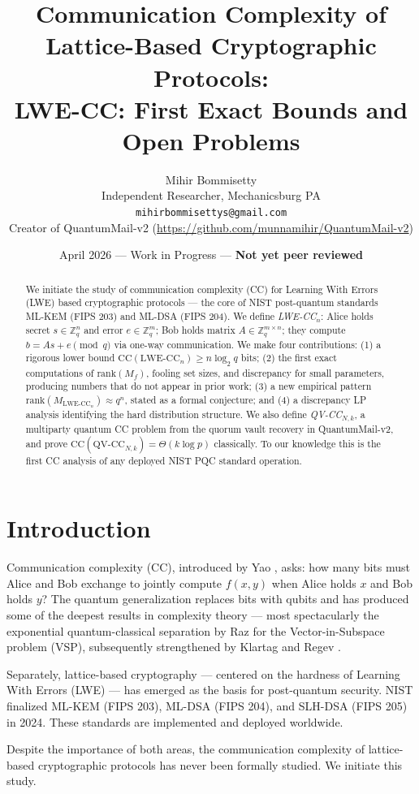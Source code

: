 \documentclass[11pt]{article}
\title{\textbf{Communication Complexity of Lattice-Based Cryptographic Protocols:\\
LWE-CC: First Exact Bounds and Open Problems}}
\author{
  Mihir Bommisetty\\
  \small Independent Researcher, Mechanicsburg PA\\
  \small \texttt{mihirbommisettys@gmail.com}\\
  \small Creator of QuantumMail-v2 (\url{https://github.com/munnamihir/QuantumMail-v2})
}
\date{April 2026 — Work in Progress — \textbf{Not yet peer reviewed}}
\theoremstyle{remark}
\newcommand{\Zq}{\mathbb{Z}_q}
\newcommand{\CC}{\mathrm{CC}}
\newcommand{\rank}{\mathrm{rank}}
\begin{document}
\maketitle

\begin{abstract}
We initiate the study of communication complexity (CC) for Learning With Errors (LWE) based cryptographic protocols — the core of NIST post-quantum standards ML-KEM (FIPS 203) and ML-DSA (FIPS 204). We define \emph{LWE-CC$_n$}: Alice holds secret $s\in\Zq^n$ and error $e\in\Zq^m$; Bob holds matrix $A\in\Zq^{m\times n}$; they compute $b = As+e \pmod{q}$ via one-way communication. We make four contributions: (1) a rigorous lower bound $\CC(\text{LWE-CC}_n)\geq n\log_2 q$ bits; (2) the first exact computations of $\rank(M_f)$, fooling set sizes, and discrepancy for small parameters, producing numbers that do not appear in prior work; (3) a new empirical pattern $\rank(M_{\text{LWE-CC}_n})\approx q^n$, stated as a formal conjecture; and (4) a discrepancy LP analysis identifying the hard distribution structure. We also define \emph{QV-CC$_{N,k}$}, a multiparty quantum CC problem from the quorum vault recovery in QuantumMail-v2, and prove $\CC(\text{QV-CC}_{N,k}) = \Theta(k\log p)$ classically. To our knowledge this is the first CC analysis of any deployed NIST PQC standard operation.
\end{abstract}

\section{Introduction}

Communication complexity (CC), introduced by Yao \cite{Yao79}, asks: how many bits must Alice and Bob exchange to jointly compute $f(x,y)$ when Alice holds $x$ and Bob holds $y$? The quantum generalization \cite{Yao93,BCW98} replaces bits with qubits and has produced some of the deepest results in complexity theory — most spectacularly the exponential quantum-classical separation by Raz \cite{Raz99} for the Vector-in-Subspace problem (VSP), subsequently strengthened by Klartag and Regev \cite{KR11}.

Separately, lattice-based cryptography — centered on the hardness of Learning With Errors (LWE) \cite{Reg05} — has emerged as the basis for post-quantum security. NIST finalized ML-KEM (FIPS 203), ML-DSA (FIPS 204), and SLH-DSA (FIPS 205) in 2024. These standards are implemented and deployed worldwide.

Despite the importance of both areas, the communication complexity of lattice-based cryptographic protocols has never been formally studied. We initiate this study.
\end{document}
